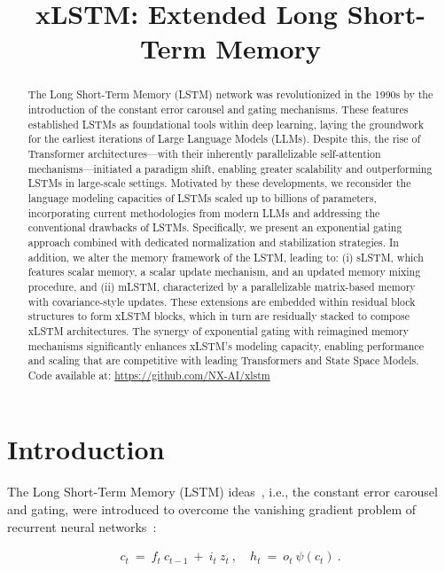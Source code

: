 \title{xLSTM: Extended Long Short-Term Memory}

\begin{abstract}
The Long Short-Term Memory (LSTM) network was revolutionized in the 1990s by the introduction of the constant error carousel and gating mechanisms. These features established LSTMs as foundational tools within deep learning, laying the groundwork for the earliest iterations of Large Language Models (LLMs). Despite this, the rise of Transformer architectures—with their inherently parallelizable self-attention mechanisms—initiated a paradigm shift, enabling greater scalability and outperforming LSTMs in large-scale settings. Motivated by these developments, we reconsider the language modeling capacities of LSTMs scaled up to billions of parameters, incorporating current methodologies from modern LLMs and addressing the conventional drawbacks of LSTMs. Specifically, we present an exponential gating approach combined with dedicated normalization and stabilization strategies. In addition, we alter the memory framework of the LSTM, leading to: (i) sLSTM, which features scalar memory, a scalar update mechanism, and an updated memory mixing procedure, and (ii) mLSTM, characterized by a parallelizable matrix-based memory with covariance-style updates. These extensions are embedded within residual block structures to form xLSTM blocks, which in turn are residually stacked to compose xLSTM architectures. The synergy of exponential gating with reimagined memory mechanisms significantly enhances xLSTM's modeling capacity, enabling performance and scaling that are competitive with leading Transformers and State Space Models.\\
Code available at: \url{https://github.com/NX-AI/xlstm}
\end{abstract}

\section{Introduction}
\label{sec:intro}

The Long Short-Term Memory (LSTM) ideas~\citep{Hochreiter:91,Hochreiter:97nips,Hochreiter:97}, i.e., the constant error carousel and gating, were introduced to overcome the vanishing gradient problem of recurrent neural networks~\citep{Hochreiter:91,Hochreiter:00book}:

\begin{align}
\label{eq:lstm_idea}
  c_t \ = \ f_t \ c_{t-1} \ + \ 
          i_t \  z_t \ , \quad  
          h_t \ = \ o_t \ \psi({c_t}) \ . 
\end{align}

